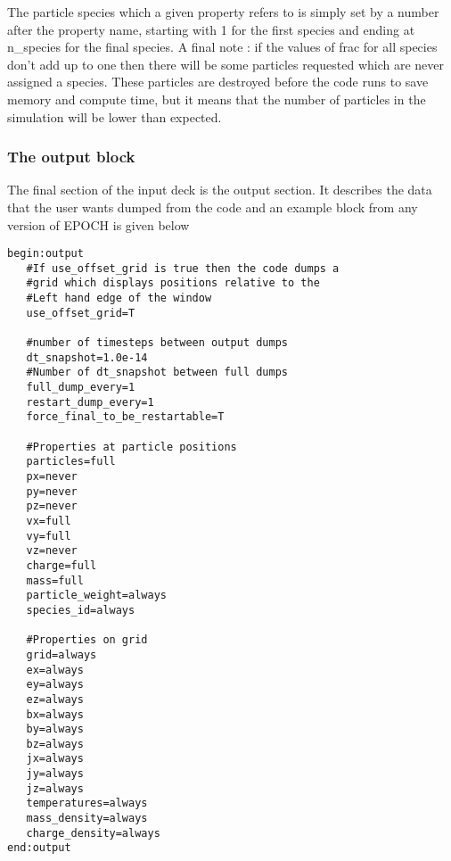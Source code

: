 \documentclass[12pt]{article}
\newcommand{\simpleboxverbatim}{\begin{Verbatim}[obeytabs=true,frame=single,
  framerule=0.5mm,rulecolor=\color{warwickmid}]}
\newcommand{\nEPOCH}{{\color{warwickdark}\fontfamily{phv}\selectfont EPOCH}}
\newcommand{\EPOCH}{{\nEPOCH} }
\begin{document}
The particle species which a given property refers to is simply set by a
number after the property name, starting with 1 for the first species and
ending at n\_species for the final species. A final note : if the values of
frac for all species don't add up to one then there will be some particles
requested which are never assigned a species. These particles are destroyed
before the code runs to save memory and compute time, but it means that the
number of particles in the simulation will be lower than expected.\\

\subsubsection{The output block}
The final section of the input deck is the output section. It describes the
data that the user wants dumped from the code and an example block from any
version of \EPOCH is given below\\
\simpleboxverbatim
begin:output
   #If use_offset_grid is true then the code dumps a
   #grid which displays positions relative to the
   #Left hand edge of the window
   use_offset_grid=T

   #number of timesteps between output dumps
   dt_snapshot=1.0e-14
   #Number of dt_snapshot between full dumps
   full_dump_every=1
   restart_dump_every=1
   force_final_to_be_restartable=T

   #Properties at particle positions
   particles=full
   px=never
   py=never
   pz=never
   vx=full
   vy=full
   vz=never
   charge=full
   mass=full
   particle_weight=always
   species_id=always

   #Properties on grid
   grid=always
   ex=always
   ey=always
   ez=always
   bx=always
   by=always
   bz=always
   jx=always
   jy=always
   jz=always
   temperatures=always
   mass_density=always
   charge_density=always
end:output
\end{Verbatim}
\end{document}
